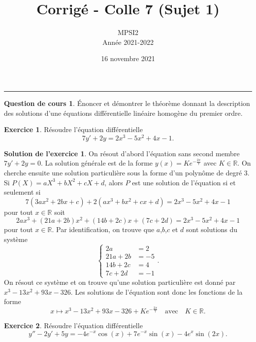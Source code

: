 \documentclass[a4paper, 11pt,openany]{article}%
\title{Corrigé - Colle 7 (Sujet 1)}
\author{MPSI2\\
Année 2021-2022}
\date{16 novembre 2021}
\theoremstyle{plain}
\theoremstyle{definition}
\newtheorem{cours}{Question de cours}
\newtheorem{exo}{Exercice}
\newtheorem{sol}{Solution de l'exercice}
\theoremstyle{remark}
\newcommand{\R}{\mathbb{R}}
\begin{document}
   \maketitle
      \rule{\linewidth}{0.5mm}


\begin{cours}
Énoncer et démontrer le théorème donnant la description des solutions d'une équations différentielle linéaire homogène du premier ordre.
\end{cours}


\begin{exo}
Résoudre l'équation différentielle
\[ 7y'+2y = 2x^3 - 5x^2 + 4x - 1.\]
\end{exo}


\begin{sol}
On résout d'abord l'équation sans second membre $7y'+2y=0$. La solution générale est de la forme $y(x)=Ke^{-\frac{2x}{7}}$ avec $K \in \R$. On cherche ensuite une solution particulière sous la forme d'un polynôme de degré 3. Si $P(X)=aX^3+bX^2+cX+d$, alors $P$ est une solution de l'équation si et seulement si 
\[ 7(3ax^2+2bx+c)+ 2(ax^3+bx^2+cx+d)=2x^3-5x^2+4x-1\]
pour tout $x \in \R$ soit
\[ 2ax^3+(21a+2b)x^2+ (14b+2c)x + (7c+2d) = 2x^3-5x^2+4x-1\]
pour tout $x \in \R$. Par identification, on trouve que $a$,$b$,$c$ et $d$ sont solutions du système
$$\begin{cases}2a&=2\\21a + 2b&=-5\\ 14b + 2c &= 4 \\  7c +2d&= - 1
\end{cases}.$$
On résout ce système et on trouve qu'une solution particulière est donné par $x^3-13x^2+93x-326$. Les solutions de l'équation sont donc les fonctions de la forme
\[ x \mapsto x^3-13x^2+93x-326+Ke^{-\frac{2x}{7}} \quad \text{avec} \quad K\in \R.\]
\end{sol}



\begin{exo}
Résoudre l'équation différentielle
\[ y''-2y'+5y=-4e^{-x}\cos(x)+7e^{-x} \sin(x)-4e^x\sin(2x).\]
\end{exo}
\end{document}
